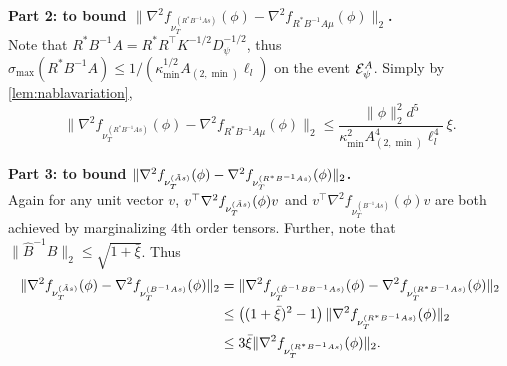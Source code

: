 {\bf Part 2: to bound $\| \nabla^2f_{\nu_T^{(R^*B^{-1}A s)}}(\phi) - \nabla^2f_{R^*B^{-1}A \mu}(\phi)\|_2$. }\\
Note that $R^*B^{-1}A = R^*R^{\top}K^{-1/2}D_{\psi}^{-1/2}$, thus $\sigma_{\max}(R^*B^{-1}A) \le 1/\left(\kappa^{1/2}_{\min}A_{(2,\min)}\ell_l\right)$ on the event $\mathcal{E}^A_{\psi}$.
Simply by \cref{lem:nablavariation}, 
\begin{equation}
\label{eq:A5part2}
\| \nabla^2f_{\nu_T^{(R^*B^{-1}A s)}}(\phi) - \nabla^2f_{R^*B^{-1}A \mu}(\phi)\|_2 \le \frac{\|\phi\|_2^2d^5}{\kappa^{2}_{\min}A^4_{(2,\min)}\ell^4_l}\,\xi.
\end{equation}

{\bf Part 3: to bound $\|\nabla^2f_{\nu_T^{(\tilde{A} s)}}(\phi)  - \nabla^2f_{\nu_T^{(R^*B^{-1}A s)}}(\phi)\|_2$. }\\
Again for any unit vector $v$, $v^{\top} \nabla^2f_{\nu_T^{(\tilde{A} s)}}(\phi) v$ and $v^{\top}\nabla^2f_{\nu_T^{(B^{-1}A s)}}(\phi)v$ are both achieved by marginalizing $4$th order tensors. 
Further, note that $\|\hat{B}^{-1}B\|_2\le \sqrt{1+\bar{\xi}}$. Thus
\begin{align*}
\|\nabla^2f_{\nu_T^{(\tilde{A} s)}}(\phi) - \nabla^2f_{\nu_T^{(B^{-1}A s)}}(\phi)\|_2 
& =
\|\nabla^2f_{\nu_T^{(\hat{B}^{-1}B B^{-1}A s)}}(\phi) - \nabla^2f_{\nu_T^{(R^*B^{-1}A s)}}(\phi)\|_2\\
& \le \left((1+\bar{\xi})^2 - 1\right)\|\nabla^2f_{\nu_T^{(R^*B^{-1}A s)}}(\phi)\|_2\\
& \le 3\bar{\xi}\|\nabla^2f_{\nu_T^{(R^*B^{-1}A s)}}(\phi)\|_2.
\end{align*} 


